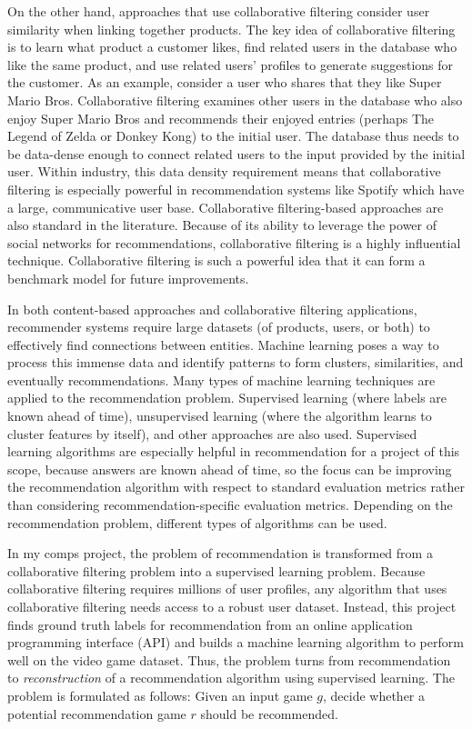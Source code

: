 \documentclass[10pt,twocolumn]{article}
\begin{document}
On the other hand, approaches that use collaborative filtering consider user similarity when linking together products. The key idea of collaborative filtering is to learn what product a customer likes, find related users in the database who like the same product, and use related users' profiles to generate suggestions for the customer. As an example, consider a user who shares that they like Super Mario Bros. Collaborative filtering examines other users in the database who also enjoy Super Mario Bros and recommends their enjoyed entries (perhaps The Legend of Zelda or Donkey Kong) to the initial user. The database thus needs to be data-dense enough to connect related users to the input provided by the initial user. Within industry, this data density requirement means that collaborative filtering is especially powerful in recommendation systems like Spotify \cite{JacobsonSpotify} which have a large, communicative user base. Collaborative filtering-based approaches are also standard in the literature. \cite{Chow, Ferdaous, PerezMarcos} Because of its ability to leverage the power of social networks for recommendations, collaborative filtering is a highly influential technique. Collaborative filtering is such a powerful idea that it can form a benchmark model for future improvements. \cite{Gohari, Ramzan} 

In both content-based approaches and collaborative filtering applications, recommender systems require large datasets (of products, users, or both) to effectively find connections between entities. Machine learning poses a way to process this immense data and identify patterns to form clusters, similarities, and eventually recommendations. Many types of machine learning techniques are applied to the recommendation problem. Supervised learning (where labels are known ahead of time), unsupervised learning (where the algorithm learns to cluster features by itself), and other approaches are also used. \cite{Nawrocka, XuAraki} Supervised learning algorithms are especially helpful in recommendation for a project of this scope, because answers are known ahead of time, so the focus can be improving the recommendation algorithm with respect to standard evaluation metrics rather than considering recommendation-specific evaluation metrics. Depending on the recommendation problem, different types of algorithms can be used.

In my comps project, the problem of recommendation is transformed from a collaborative filtering problem into a supervised learning problem. Because collaborative filtering requires millions of user profiles, any algorithm that uses collaborative filtering needs access to a robust user dataset. Instead, this project finds ground truth labels for recommendation from an online application programming interface (API) and builds a machine learning algorithm to perform well on the video game dataset. Thus, the problem turns from recommendation to \textit{reconstruction} of a recommendation algorithm using supervised learning. The problem is formulated as follows: Given an input game $g$, decide whether a potential recommendation game $r$ should be recommended.
\end{document}

